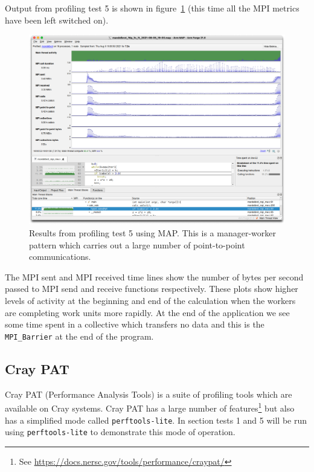 \documentclass[a4paper,titlepage]{article}
\begin{document}
Output from profiling test 5 is shown in figure~\ref{fig:MAP_test5} (this time all the MPI metrics have been left switched on).
\begin{figure}[htbp]
\begin{center}
\includegraphics[scale=0.3]{figures/MAP_test5}
\caption{Results from profiling test 5 using MAP. This is a manager-worker pattern which carries out a large number of point-to-point communications.}
\label{fig:MAP_test5}
\end{center}
\end{figure}
The MPI sent and MPI received time lines show the number of bytes per second passed to MPI send and receive functions respectively. These plots show higher levels of activity at the beginning and end of the calculation when the workers are completing work units more rapidly. At the end of the application we see some time spent in a collective which transfers no data and this is the \verb+MPI_Barrier+ at the end of the program.

\pagebreak


\subsection{Cray PAT}

Cray PAT (Performance Analysis Tools) is a suite of profiling tools which are available on Cray systems. Cray PAT has a large number of features\footnote{See \url{https://docs.nersc.gov/tools/performance/craypat/}} but also has a simplified mode called \verb+perftools-lite+. In section tests 1 and 5 will be run using \verb+perftools-lite+ to demonstrate this mode of operation. 
\end{document}
